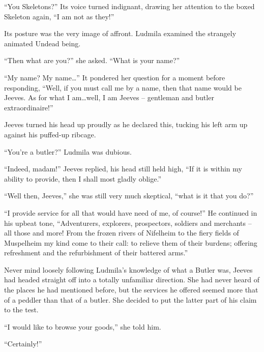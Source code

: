  

“You Skeletons?” Its voice turned indignant, drawing her attention to the boxed Skeleton again, “I am not as they!”

 

Its posture was the very image of affront. Ludmila examined the strangely animated Undead being.

 

“Then what are you?” she asked. “What is your name?”

 

“My name? My name…” It pondered her question for a moment before responding, “Well, if you must call me by a name, then that name would be Jeeves. As for what I am…well, I am Jeeves – gentleman and butler extraordinaire!”

 

Jeeves turned his head up proudly as he declared this, tucking his left arm up against his puffed-up ribcage.

 

“You’re a butler?” Ludmila was dubious.

 

“Indeed, madam!” Jeeves replied, his head still held high, “If it is within my ability to provide, then I shall most gladly oblige.”

 

“Well then, Jeeves,” she was still very much skeptical, “what is it that you do?”

 

“I provide service for all that would have need of me, of course!” He continued in his upbeat tone, “Adventurers, explorers, prospectors, soldiers and merchants – all those and more! From the frozen rivers of Nifelheim to the fiery fields of Muspelheim my kind come to their call: to relieve them of their burdens; offering refreshment and the refurbishment of their battered arms.”

 

Never mind loosely following Ludmila’s knowledge of what a Butler was, Jeeves had headed straight off into a totally unfamiliar direction. She had never heard of the places he had mentioned before, but the services he offered seemed more that of a peddler than that of a butler. She decided to put the latter part of his claim to the test.

 

“I would like to browse your goods,” she told him.

 

“Certainly!”


